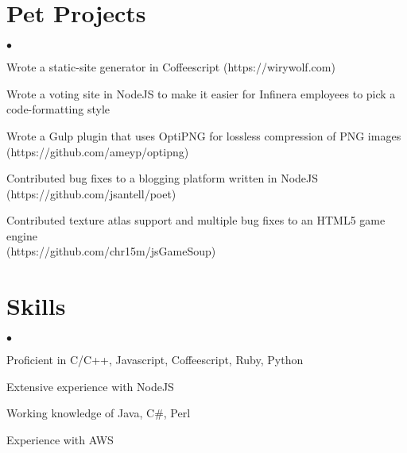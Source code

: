 \documentclass[margin,line]{res}
\newenvironment{list2}{
  \begin{list}{$\bullet$}{%
      \setlength{\itemsep}{0in}
      \setlength{\parsep}{0in} \setlength{\parskip}{0in}
      \setlength{\topsep}{0in} \setlength{\partopsep}{0in}
      \setlength{\leftmargin}{0.2in}}}{\end{list}}
\begin{document}
\begin{resume}
\section{\sc Pet Projects}
\begin{list2}
  \item Wrote a static-site generator in Coffeescript (https://wirywolf.com)
  \item Wrote a voting site in NodeJS to make it easier for Infinera employees to pick a code-formatting style
  \item Wrote a Gulp plugin that uses OptiPNG for lossless compression of PNG images \\ (https://github.com/ameyp/optipng)
  \item Contributed bug fixes to a blogging platform written in NodeJS \- (https://github.com/jsantell/poet)
  \item Contributed texture atlas support and multiple bug fixes to an HTML5 game engine \\ (https://github.com/chr15m/jsGameSoup)
\end{list2}

\section{\sc Skills}
\begin{list2}
\item Proficient in C/C++, Javascript, Coffeescript, Ruby, Python
\item Extensive experience with NodeJS
\item Working knowledge of Java, C\#, Perl
\item Experience with AWS
\end{list2}

\end{resume}
\end{document}
